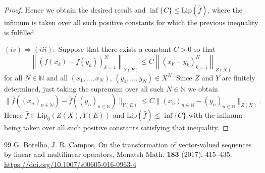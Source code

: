 \documentclass[10pt,a4paper]{amsart}
\def\N{\mathbb{N}}
\def\Lip{\mathrm{Lip}_0}
\def\Lipnorm{\mathrm{Lip}}
\begin{document}
\begin{proof}
	Hence we obtain the desired result and $\inf\{C\} \leq \Lipnorm(\hat{f})$, where the infimum is taken over all such positive constants for which the previous inequality is fulfilled.

	$(iv) \Rightarrow (iii):$ Suppose that there exists a constant $C>0$ so that
	$$
	\left\|(f(x_k)-f(y_k))_{k=1}^N\right\|_{Y(E)} \leq C\left\|(x_k-y_k)_{k=1}^N\right\|_{Z(X)}
	$$
	for all $N\in\N$ and all $(x_1,\ldots,x_N)$, $(y_1,\ldots,y_N)\in X^N$. Since $Z$ and $Y$ are finitely determined, just taking the supremum over all such $N\in\N$ we obtain
	$$
	\|\hat{f}((x_n)_{n\in\N})-\hat{f}((y_n)_{n\in\N})\|_{Y(E)} \leq C\|(x_n)_{n\in\N}-(y_n)_{n\in\N}\|_{Z(X)}.
	$$
	Hence $\hat{f} \in \Lip(Z(X),Y(E))$ and $\Lipnorm(\hat{f}) \leq \inf\{C\}$ with the infimum being taken over all such positive constants satisfying that inequality.
\end{proof}


\begin{thebibliography}{99}
 G. Botelho, J. R. Campos, On the transformation of vector-valued sequences by linear and multilinear operators, Monatsh Math. \textbf{183} (2017), 415--435. \url{https://doi.org/10.1007/s00605-016-0963-4}
\end{thebibliography}
\end{document}
